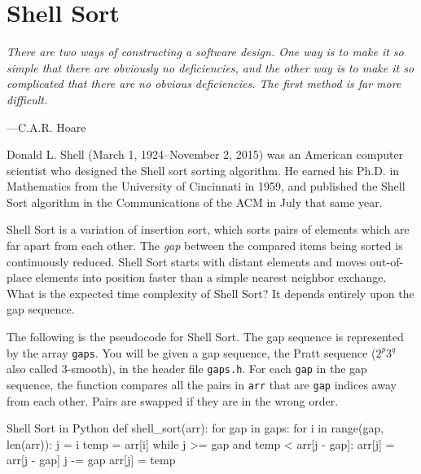 \section{Shell Sort}

\epigraph{\emph{There are two ways of constructing a software design.
    One way is to make it so simple that there are obviously no
    deficiencies, and the other way is to make it so complicated that
    there are no obvious deficiencies. The first method is far more
difficult.}}{---C.A.R. Hoare}

\noindent
Donald L. Shell (March 1, 1924--November 2, 2015) was an American
computer scientist who designed the Shell sort sorting algorithm.
He earned his Ph.D. in Mathematics from the University of Cincinnati
in 1959, and published the Shell Sort algorithm in the Communications
of the ACM in July that same year.

Shell Sort is a variation of insertion sort, which sorts pairs of
elements which are far apart from each other. The \emph{gap} between the
compared items being sorted is continuously reduced. Shell Sort starts
with distant elements and moves out-of-place elements into position
faster than a simple nearest neighbor exchange. What is the expected
time complexity of Shell Sort? It depends entirely upon the gap
sequence.

The following is the pseudocode for Shell Sort. The gap sequence is
represented by the array \texttt{gaps}. You will be given a gap
sequence, the Pratt sequence ($2^p 3^q$ also called $3$-smooth), in the
header file \texttt{gaps.h}.  For each \texttt{gap} in the gap sequence,
the function compares all the pairs in \texttt{arr} that are
\texttt{gap} indices away from each other. Pairs are swapped if they are
in the wrong order.

\begin{pylisting}{Shell Sort in Python}
def shell_sort(arr):
    for gap in gaps:
        for i in range(gap, len(arr)):
            j = i
            temp = arr[i]
            while j >= gap and temp < arr[j - gap]:
                arr[j] = arr[j - gap]
                j -= gap
            arr[j] = temp
\end{pylisting}
